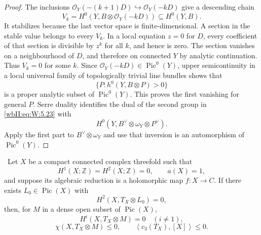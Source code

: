 \begin{proof}
The inclusions \(\mathcal O_Y(-(k+1)D)\hookrightarrow
\mathcal O_Y(-kD)\) give a descending chain
\[
 V_k=H^0(Y,B\otimes\mathcal O_Y(-kD))
 \subseteq H^0(Y,B).
\]
It stabilizes because the last vector space is finite-dimensional.  A
section in the stable value belongs to every \(V_k\).  In a local equation
\(z=0\) for \(D\), every coefficient of that section is divisible by
\(z^k\) for all \(k\), and hence is zero.  The section vanishes on a
neighbourhood of \(D\), and therefore on connected \(Y\) by analytic
continuation.  Thus \(V_k=0\) for some \(k\).  Since
\(\mathcal O_Y(-kD)\in\operatorname{Pic}^0(Y)\), upper semicontinuity in a
local universal family of topologically trivial line bundles shows that
\[
 \{P:h^0(Y,B\otimes P)>0\}
\]
is a proper analytic subset of \(\operatorname{Pic}^0(Y)\).  This proves
the first vanishing for general \(P\).  Serre duality identifies the dual
of the second group in \eqref{wbII:eq:W:5.23} with
\[
 H^0(Y,B^\vee\otimes\omega_Y\otimes P^\vee).
\]
Apply the first part to \(B^\vee\otimes\omega_Y\) and use that inversion is
an automorphism of \(\operatorname{Pic}^0(Y)\).
\end{proof}

\begin{theorem}
\label{wbII:thm:corrected-cdp-global}\label{wbII:thm:corrected-global}
\ Let \(X\) be a compact connected complex threefold such that
\[
 H^1(X;\mathbb Z)=H^2(X;\mathbb Z)=0,\qquad a(X)=1,
\]
and suppose its algebraic reduction is a holomorphic map
\(f:X\to C\).  If there exists \(L_0\in\operatorname{Pic}(X)\) with
\[
 H^2(X,T_X\otimes L_0)=0,
\tag{W.51}\label{wbII:eq:W:5.24}
\]
then, for \(M\) in a dense open subset of \(\operatorname{Pic}(X)\),
\[
 H^i(X,T_X\otimes M)=0\quad(i\ne1),
\tag{W.52}\label{wbII:eq:W:5.25}
\]
\[
 \chi(X,T_X\otimes M)\le0,\qquad
 \left\langle c_3(T_X),[X]\right\rangle\le0.
\tag{W.53}\label{wbII:eq:W:5.26}
\]
\end{theorem}

